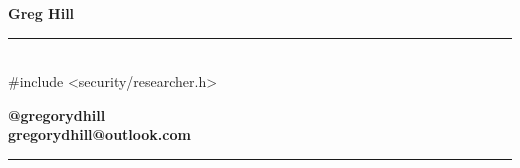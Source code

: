 \documentclass[11pt,a4paper]{memoir}
\begin{document}
    \begin{Spacing}{0.75}%
    \noindent
    \begin{center}
    	\textbf{\Large Greg Hill}\\
    	\vspace{-1mm}%
    	\rule{74mm}{.3mm}\\
    	\vspace{2mm}%
    	\tiny {\color{gray}\#include <security/researcher.h> }
    \end{center}
    \hspace{3mm}
    \begin{minipage}[t]{42mm}
        \vspace{5mm}%
        \begin{flushleft}
        {\scriptsize
            \begin{Spacing}{2}%
            \textbf{@gregorydhill}\\
            \textbf{gregorydhill@outlook.com}\\
            \end{Spacing}
        }
        \end{flushleft}
    \end{minipage}
    \rule{74mm}{0mm}\\
    \end{Spacing}
\end{document}
